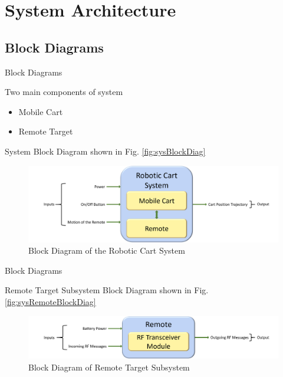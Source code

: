 \documentclass{beamer}
\begin{document}

\section{System Architecture}

\subsection{Block Diagrams}
\begin{frame}{Block Diagrams}
  \begin{block}{}
    Two main components of system
    \begin{itemize}
      \item Mobile Cart
      \item Remote Target
    \end{itemize}
    System Block Diagram shown in Fig. \autoref{fig:sysBlockDiag}
  \end{block}
  \begin{figure}[b]
    \centering
    \includegraphics[width=\textwidth]{figs/img/systemBlockDiagram.png}
    \caption{Block Diagram of the Robotic Cart System}
    \label{fig:sysBlockDiag}
  \end{figure}
\end{frame}


\begin{frame}{Block Diagrams}
  \begin{block}{}
    Remote Target Subsystem Block Diagram shown in Fig. \autoref{fig:sysRemoteBlockDiag}
  \end{block}
  \begin{figure}[b]
    \centering
    \includegraphics[width=\textwidth]{figs/img/remoteBlockDiagram.png}
    \caption{Block Diagram of Remote Target Subsystem}
    \label{fig:sysRemoteBlockDiag}
  \end{figure}
\end{frame}
\end{document}
